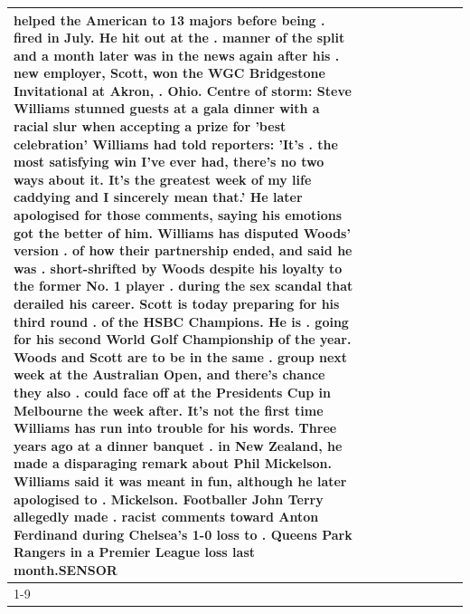 \begin{table}[H]
\begin{tabular}{lllrlllll}
helped the American to 13 majors before being . fired in July. He hit out at the . manner of the split and a month later was in the news again after his . new employer, Scott, won the WGC Bridgestone Invitational at Akron, . Ohio. Centre of storm: Steve Williams stunned guests at a gala dinner with a racial slur when accepting a prize for 'best celebration' Williams had told reporters: 'It's . the most satisfying win I've ever had, there's no two ways about it. It's the greatest week of my life caddying and I sincerely mean that.' He later apologised for those comments, saying his emotions got the better of him. Williams has disputed Woods' version . of how their partnership ended, and said he was . short-shrifted by Woods despite his loyalty to the former No. 1 player . during the sex scandal that derailed his career. Scott is today preparing for his third round . of the HSBC Champions. He is . going for his second World Golf Championship of the year. Woods and Scott are to be in the same . group next week at the Australian Open, and there's chance they also . could face off at the Presidents Cup in Melbourne the week after. It's not the first time Williams has run into trouble for his words. Three years ago at a dinner banquet . in New Zealand, he made a disparaging remark about Phil Mickelson. Williams said it was meant in fun, although he later apologised to . Mickelson. Footballer John Terry allegedly made . racist comments toward Anton Ferdinand during Chelsea's 1-0 loss to . Queens Park Rangers in a Premier League loss last month.SENSOR \\
\cline{1-9}

\end{tabular}
\end{table}
